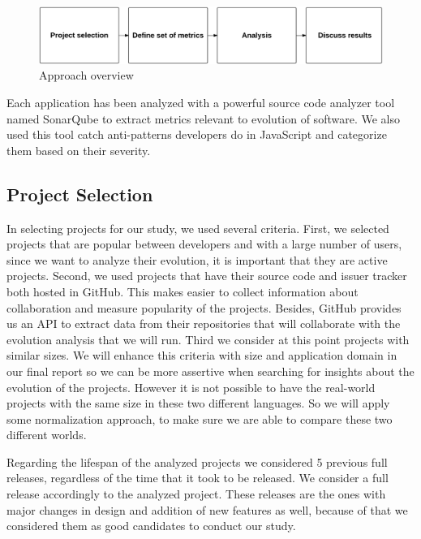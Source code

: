  \begin{figure}[thb!]
 	\caption{Approach overview}
 	\centering
 	\label{fig:approach_overview}
 	\includegraphics[width=1\textwidth]{figures/approach_overview}
 \end{figure}

Each application has been analyzed with a powerful source code analyzer tool named SonarQube to extract metrics relevant to evolution of software. We also used this tool catch anti-patterns developers do in JavaScript and categorize them based on their severity.

\subsection{Project Selection}

In selecting projects for our study, we used several criteria. First, we selected projects that are popular between developers and with a large number of users, since we want to analyze their evolution, it is important that they are active projects. Second, we used projects that have their source code and issuer tracker both hosted in GitHub. This makes easier to collect information about collaboration and measure popularity of the projects. Besides, GitHub provides us an API to extract data from their repositories that will collaborate with the evolution analysis that we will run. Third we consider at this point projects with similar sizes. We will enhance this criteria with size and application domain in our final report so we can be more assertive when searching for insights about the evolution of the projects. However it is not possible to have the real-world projects with the same size in these two different languages. So we will apply some normalization approach, to make sure we are able to compare these two different worlds.

Regarding the lifespan of the analyzed projects we considered 5 previous full releases, regardless of the time that it took to be released. We consider a full release accordingly to the analyzed project. These releases are the ones with major changes in design and addition of new features as well, because of that we considered them as good candidates to conduct our study.  

